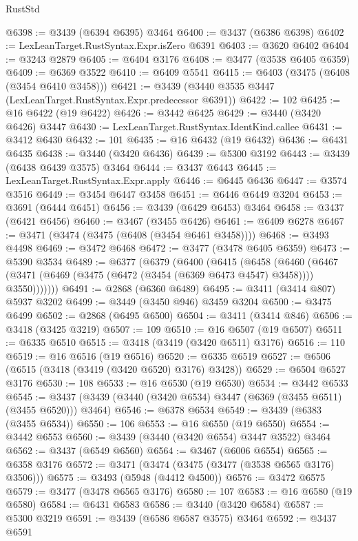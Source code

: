 \begin{lexlean}{RustStd}
\begin{coremodule}
{{{{{{{{{{{{{{{{{{{@6398 := @3439 (@6394 @6395) @3464
@6400 := @3437 (@6386 @6398)
@6402 := LexLeanTarget.RustSyntax.Expr.isZero @6391
@6403 := @3620 @6402
@6404 := @3243 @2879
@6405 := @6404 @3176
@6408 := @3477 (@3538 @6405 @6359)
@6409 := @6369 @3522
@6410 := @6409 @5541
@6415 := @6403 (@3475 (@6408 (@3454 @6410 @3458)))
@6421 := @3439 (@3440 @3535 @3447 (LexLeanTarget.RustSyntax.Expr.predecessor @6391))
@6422 := 102
@6425 := @16 @6422 (@19 @6422)
@6426 := @3442 @6425
@6429 := @3440 (@3420 @6426) @3447
@6430 := LexLeanTarget.RustSyntax.IdentKind.callee
@6431 := @3412 @6430
@6432 := 101
@6435 := @16 @6432 (@19 @6432)
@6436 := @6431 @6435
@6438 := @3440 (@3420 @6436)
@6439 := @5300 @3192
@6443 := @3439 (@6438 @6439 @3575) @3464
@6444 := @3437 @6443
@6445 := LexLeanTarget.RustSyntax.Expr.apply
@6446 := @6445 @6436
@6447 := @3574 @3516
@6449 := @3454 @6447 @3458
@6451 := @6446 @6449 @3204
@6453 := @3691 (@6444 @6451)
@6456 := @3439 (@6429 @6453) @3464
@6458 := @3437 (@6421 @6456)
@6460 := @3467 (@3455 @6426)
@6461 := @6409 @6278
@6467 := @3471 (@3474 (@3475 (@6408 (@3454 @6461 @3458))))
@6468 := @3493 @4498
@6469 := @3472 @6468
@6472 := @3477 (@3478 @6405 @6359)
@6473 := @5390 @3534
@6489 := @6377
    (@6379
      (@6400
        (@6415
          (@6458
            (@6460
              (@6467 (@3471 (@6469 (@3475 (@6472 (@3454 (@6369 @6473 @4547) @3458)))) @3550)))))))
@6491 := @2868 (@6360 @6489)
@6495 := @3411 (@3414 @807) @5937 @3202
@6499 := @3449 (@3450 @946) @3459 @3204
@6500 := @3475 @6499
@6502 := @2868 (@6495 @6500)
@6504 := @3411 (@3414 @846)
@6506 := @3418 (@3425 @3219)
@6507 := 109
@6510 := @16 @6507 (@19 @6507)
@6511 := @6335 @6510
@6515 := @3418 (@3419 (@3420 @6511) @3176)
@6516 := 110
@6519 := @16 @6516 (@19 @6516)
@6520 := @6335 @6519
@6527 := @6506 (@6515 (@3418 (@3419 (@3420 @6520) @3176) @3428))
@6529 := @6504 @6527 @3176
@6530 := 108
@6533 := @16 @6530 (@19 @6530)
@6534 := @3442 @6533
@6545 := @3437 (@3439 (@3440 (@3420 @6534) @3447 (@6369 (@3455 @6511) (@3455 @6520))) @3464)
@6546 := @6378 @6534
@6549 := @3439 (@6383 (@3455 @6534))
@6550 := 106
@6553 := @16 @6550 (@19 @6550)
@6554 := @3442 @6553
@6560 := @3439 (@3440 (@3420 @6554) @3447 @3522) @3464
@6562 := @3437 (@6549 @6560)
@6564 := @3467 (@6006 @6554)
@6565 := @6358 @3176
@6572 := @3471 (@3474 (@3475 (@3477 (@3538 @6565 @3176) @3506)))
@6575 := @3493 (@5948 (@4412 @4500))
@6576 := @3472 @6575
@6579 := @3477 (@3478 @6565 @3176)
@6580 := 107
@6583 := @16 @6580 (@19 @6580)
@6584 := @6431 @6583
@6586 := @3440 (@3420 @6584)
@6587 := @5300 @3219
@6591 := @3439 (@6586 @6587 @3575) @3464
@6592 := @3437 @6591
}}}}}}}}}}}}}}}}}}}
\end{coremodule}
\end{lexlean}

